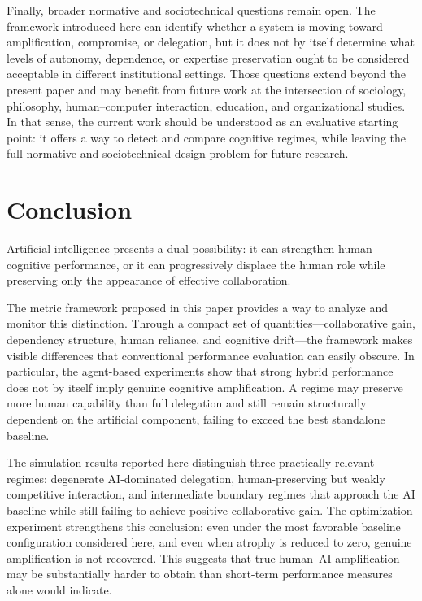 \documentclass[11pt,a4paper]{article}
\begin{document}
Finally, broader normative and sociotechnical questions remain open. The framework introduced here can identify whether a system is moving toward amplification, compromise, or delegation, but it does not by itself determine what levels of autonomy, dependence, or expertise preservation ought to be considered acceptable in different institutional settings. Those questions extend beyond the present paper and may benefit from future work at the intersection of sociology, philosophy, human--computer interaction, education, and organizational studies. In that sense, the current work should be understood as an evaluative starting point: it offers a way to detect and compare cognitive regimes, while leaving the full normative and sociotechnical design problem for future research.

\section{Conclusion}

Artificial intelligence presents a dual possibility: it can strengthen human cognitive performance, or it can progressively displace the human role while preserving only the appearance of effective collaboration.

The metric framework proposed in this paper provides a way to analyze and monitor this distinction. Through a compact set of quantities---collaborative gain, dependency structure, human reliance, and cognitive drift---the framework makes visible differences that conventional performance evaluation can easily obscure. In particular, the agent-based experiments show that strong hybrid performance does not by itself imply genuine cognitive amplification. A regime may preserve more human capability than full delegation and still remain structurally dependent on the artificial component, failing to exceed the best standalone baseline.

The simulation results reported here distinguish three practically relevant regimes: degenerate AI-dominated delegation, human-preserving but weakly competitive interaction, and intermediate boundary regimes that approach the AI baseline while still failing to achieve positive collaborative gain. The optimization experiment strengthens this conclusion: even under the most favorable baseline configuration considered here, and even when atrophy is reduced to zero, genuine amplification is not recovered. This suggests that true human--AI amplification may be substantially harder to obtain than short-term performance measures alone would indicate.
\end{document}
